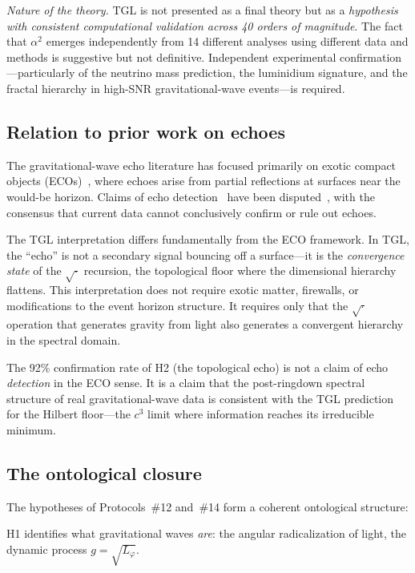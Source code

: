 \documentclass[12pt,a4paper,twocolumn]{article}
\newcommand{\alphaii}{\alpha^{2}}
\begin{document}
\textit{Nature of the theory.} TGL is not presented as a final theory but as a \emph{hypothesis with consistent computational validation across 40 orders of magnitude}. The fact that $\alphaii$ emerges independently from 14 different analyses using different data and methods is suggestive but not definitive. Independent experimental confirmation---particularly of the neutrino mass prediction, the luminidium signature, and the fractal hierarchy in high-SNR gravitational-wave events---is required.

\subsection{Relation to prior work on echoes}

The gravitational-wave echo literature has focused primarily on exotic compact objects (ECOs)~\cite{Cardoso2016}, where echoes arise from partial reflections at surfaces near the would-be horizon. Claims of echo detection~\cite{Abedi2017} have been disputed~\cite{Westerweck2018,Nielsen2019}, with the consensus that current data cannot conclusively confirm or rule out echoes.

The TGL interpretation differs fundamentally from the ECO framework. In TGL, the ``echo'' is not a secondary signal bouncing off a surface---it is the \emph{convergence state} of the $\sqrt{\cdot}$ recursion, the topological floor where the dimensional hierarchy flattens. This interpretation does not require exotic matter, firewalls, or modifications to the event horizon structure. It requires only that the $\sqrt{\cdot}$ operation that generates gravity from light also generates a convergent hierarchy in the spectral domain.

The 92\% confirmation rate of H2 (the topological echo) is not a claim of echo \emph{detection} in the ECO sense. It is a claim that the post-ringdown spectral structure of real gravitational-wave data is consistent with the TGL prediction for the Hilbert floor---the $c^3$ limit where information reaches its irreducible minimum.

\subsection{The ontological closure}

The hypotheses of Protocols~\#12 and~\#14 form a coherent ontological structure:

H1 identifies what gravitational waves \emph{are}: the angular radicalization of light, the dynamic process $g = \sqrt{L_\varphi}$.
\end{document}
